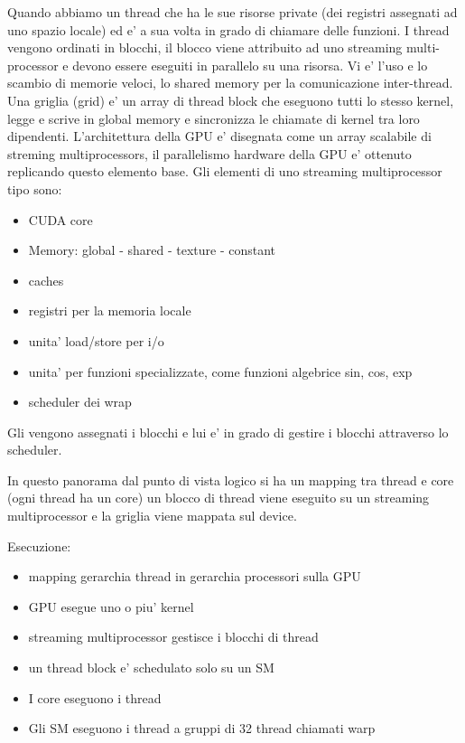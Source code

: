 Quando abbiamo un thread che ha le sue risorse private (dei registri assegnati ad uno spazio locale) ed e' a sua volta in grado di chiamare delle funzioni. I thread vengono ordinati in blocchi, il blocco viene attribuito ad uno streaming multi-processor e devono essere eseguiti in parallelo su una risorsa. Vi e' l'uso e lo scambio di memorie veloci, lo shared memory per la comunicazione inter-thread. Una griglia (grid) e' un array di thread block che eseguono tutti lo stesso kernel, legge e scrive in global memory e sincronizza le chiamate di kernel tra loro dipendenti.
L'architettura della GPU e' disegnata come un array scalabile di streming multiprocessors, il parallelismo hardware della GPU e' ottenuto replicando questo elemento base.
Gli elementi di uno streaming multiprocessor tipo sono:
\begin{itemize}
    \item CUDA core
    \item Memory: global - shared - texture - constant
    \item caches
    \item registri per la memoria locale
    \item unita' load/store per i/o
    \item unita' per funzioni specializzate, come funzioni algebrice sin, cos, exp
    \item scheduler dei wrap
\end{itemize}
Gli vengono assegnati i blocchi e lui e' in grado di gestire i blocchi attraverso lo scheduler.

In questo panorama dal punto di vista logico si ha un mapping tra thread e core (ogni thread ha un core) un blocco di thread viene eseguito su un streaming multiprocessor e la griglia viene mappata sul device.

Esecuzione:
\begin{itemize}
    \item mapping gerarchia thread in gerarchia processori sulla GPU
    \item GPU esegue uno o piu' kernel
    \item streaming multiprocessor gestisce i blocchi di thread
    \item un thread block e' schedulato solo su un SM 
    \item I core eseguono i thread
    \item Gli SM eseguono i thread a gruppi di 32 thread chiamati warp
\end{itemize}


